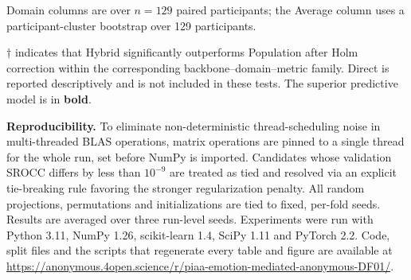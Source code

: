 \begin{table}[t]
\centering
\footnotesize
\setlength{\tabcolsep}{4.5pt}
\caption{Performance comparison of Population (Ridge), Direct (Ridge) and Hybrid (Ridge) across visual backbones and image domains (mean $\pm$ SEM over user--domain units).}
\label{tab:backbone}
\begin{threeparttable}
    
    \begin{tablenotes}[flushleft]\footnotesize
    \item Domain columns are over $n=129$ paired participants; the Average column uses a participant-cluster bootstrap over 129 participants.
    \item $\dagger$ indicates that Hybrid significantly outperforms Population after Holm correction within the corresponding backbone--domain--metric family. Direct is reported descriptively and is not included in these tests. The superior predictive model is in \textbf{bold}.
    \end{tablenotes}
\end{threeparttable}
\end{table}

\textbf{Reproducibility.}
To eliminate non-deterministic thread-scheduling noise in multi-threaded BLAS operations, matrix operations are pinned to a single thread for the whole run, set before NumPy is imported. Candidates whose validation SROCC differs by less than $10^{-9}$ are treated as tied and resolved via an explicit tie-breaking rule favoring the stronger regularization penalty. All random projections, permutations and initializations are tied to fixed, per-fold seeds. Results are averaged over three run-level seeds.
Experiments were run with Python 3.11, NumPy 1.26, scikit-learn 1.4, SciPy 1.11 and PyTorch 2.2. Code, split files and the scripts that regenerate every table and figure are available at \url{https://anonymous.4open.science/r/piaa-emotion-mediated-anonymous-DF01/}.

